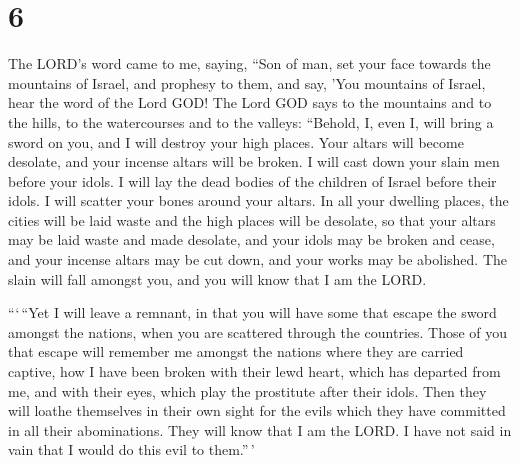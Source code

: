 \hypertarget{section-5}{%
\section{6}\label{section-5}}

 The LORD's word came to me, saying,  ``Son
of man, set your face towards the mountains of Israel, and prophesy to
them,  and say, 'You mountains of Israel, hear the word of
the Lord GOD! The Lord GOD says to the mountains and to the hills, to
the watercourses and to the valleys: ``Behold, I, even I, will bring a
sword on you, and I will destroy your high places.  Your
altars will become desolate, and your incense altars will be broken. I
will cast down your slain men before your idols.  I will
lay the dead bodies of the children of Israel before their idols. I will
scatter your bones around your altars.  In all your
dwelling places, the cities will be laid waste and the high places will
be desolate, so that your altars may be laid waste and made desolate,
and your idols may be broken and cease, and your incense altars may be
cut down, and your works may be abolished.  The slain will
fall amongst you, and you will know that I am the LORD.

 ```\,``Yet I will leave a remnant, in that you will have
some that escape the sword amongst the nations, when you are scattered
through the countries.  Those of you that escape will
remember me amongst the nations where they are carried captive, how I
have been broken with their lewd heart, which has departed from me, and
with their eyes, which play the prostitute after their idols. Then they
will loathe themselves in their own sight for the evils which they have
committed in all their abominations.  They will know that
I am the LORD. I have not said in vain that I would do this evil to
them.''\,'

